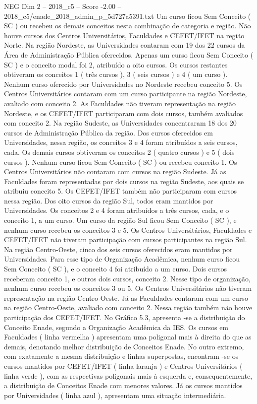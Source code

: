 \begin{textsample}{NEG Dim 2 – 2018\_c5 – Score -2.00 – 2018\_c5/enade\_2018\_admin\_p\_5d727a5391.txt}
Um curso ficou Sem Conceito ( SC ) ou recebeu os demais conceitos nesta combinação de categoria e região.
Não houve cursos dos Centros Universitários, Faculdades e CEFET/IFET na região Norte.
Na região Nordeste, as Universidades contaram com 19 dos 22 cursos da Área de Administração Pública oferecidos.
Apenas um curso ficou Sem Conceito ( SC ) e o conceito modal foi 2, atribuído a oito cursos.
Os cursos restantes obtiveram os conceitos 1 ( três cursos ), 3 ( seis cursos ) e 4 ( um curso ).
Nenhum curso oferecido por Universidades no Nordeste recebeu conceito 5.
Os Centros Universitários contaram com um curso participante na região Nordeste, avaliado com conceito 2.
As Faculdades não tiveram representação na região Nordeste, e os CEFET/IFET participaram com dois cursos, também avaliados com conceito 2.
Na região Sudeste, as Universidades concentraram 18 dos 20 cursos de Administração Pública da região.
Dos cursos oferecidos em Universidades, nessa região, os conceitos 3 e 4 foram atribuídos a seis cursos, cada.
Os demais cursos obtiveram os conceitos 2 ( quatro cursos ) e 5 ( dois cursos ).
Nenhum curso ficou Sem Conceito ( SC ) ou recebeu conceito 1.
Os Centros Universitários não contaram com cursos na região Sudeste.
Já as Faculdades foram representadas por dois cursos na região Sudeste, aos quais se atribuiu conceito 5.
Os CEFET/IFET também não participaram com cursos nessa região.
Dos oito cursos da região Sul, todos eram mantidos por Universidades.
Os conceitos 2 e 4 foram atribuídos a três cursos, cada, e o conceito 1, a um curso.
Um curso da região Sul ficou Sem Conceito ( SC ), e nenhum curso recebeu os conceitos 3 e 5.
Os Centros Universitários, Faculdades e CEFET/IFET não tiveram participação com cursos participantes na região Sul.
Na região Centro-Oeste, cinco dos seis cursos oferecidos eram mantidos por Universidades.
Para esse tipo de Organização Acadêmica, nenhum curso ficou Sem Conceito ( SC ), e o conceito 4 foi atribuído a um curso.
Dois cursos receberam conceito 1, e outros dois cursos, conceito 2.
Nesse tipo de organização, nenhum curso recebeu os conceitos 3 ou 5.
Os Centros Universitários não tiveram representação na região Centro-Oeste.
Já as Faculdades contaram com um curso na região Centro-Oeste, avaliado com conceito 2.
Nessa região também não houve participação dos CEFET/IFET.
No Gráfico 5.3, apresenta -se a distribuição do Conceito Enade, segundo a Organização Acadêmica da IES.
Os cursos em Faculdades ( linha vermelha ) apresentam uma poligonal mais à direita do que as demais, denotando melhor distribuição de Conceitos Enade.
No outro extremo, com exatamente a mesma distribuição e linhas superpostas, encontram -se os cursos mantidos por CEFET/IFET ( linha laranja ) e Centros Universitários ( linha verde ), com as respectivas poligonais mais à esquerda e, consequentemente, a distribuição de Conceitos Enade com menores valores.
Já os cursos mantidos por Universidades ( linha azul ), apresentam uma situação intermediária.

\end{textsample}
